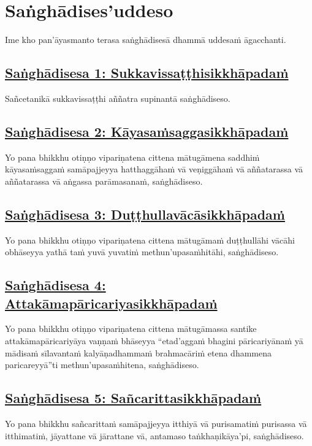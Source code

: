 \setsecheadstyle{\sectionFmt}
\section{Saṅghādises'uddeso}
\label{sd}

\begin{intro}
  Ime kho pan'āyasmanto terasa saṅghādisesā dhammā uddesaṁ āgacchanti.
\end{intro}

\subsection*{\hyperref[comm1]{Saṅghādisesa 1: Sukkavissaṭṭhisikkhāpadaṁ}}
\label{sd1}
Sañcetanikā sukkavissaṭṭhi aññatra supinantā saṅghādiseso.

\subsection*{\hyperref[comm2]{Saṅghādisesa 2: Kāyasaṁsaggasikkhāpadaṁ}}
\label{sd2}
Yo pana bhikkhu otiṇṇo vipariṇatena cittena mātugāmena saddhiṁ kāyasaṁsaggaṁ samāpajjeyya hatthaggāhaṁ vā veṇiggāhaṁ vā aññatarassa vā aññatarassa vā aṅgassa parāmasanaṁ, saṅghādiseso.

\subsection*{\hyperref[comm3]{Saṅghādisesa 3: Duṭṭhullavācāsikkhāpadaṁ}}
\label{sd3}
Yo pana bhikkhu otiṇṇo vipariṇatena cittena mātugāmaṁ duṭṭhullāhi vācāhi obhāseyya yathā taṁ yuvā yuvatiṁ methun'upasaṁhitāhi, saṅghādiseso.

\subsection*{\hyperref[comm4]{Saṅghādisesa 4: Attakāmapāricariyasikkhāpadaṁ}}
\label{sd4}
Yo pana bhikkhu otiṇṇo vipariṇatena cittena mātugāmassa santike attakāmapāricariyāya vaṇṇaṁ bhāseyya “etad'aggaṁ bhagini pāricariyānaṁ yā mādisaṁ sīlavantaṁ kalyāṇadhammaṁ brahmacāriṁ etena dhammena paricareyyā”ti methun'upasaṁhitena, saṅghādiseso.

\subsection*{\hyperref[comm5]{Saṅghādisesa 5: Sañcarittasikkhāpadaṁ}}
\label{sd5}
Yo pana bhikkhu sañcarittaṁ samāpajjeyya itthiyā vā purisamatiṁ purisassa vā itthimatiṁ, jāyattane vā jārattane vā, antamaso taṅkhaṇikāya'pi, saṅghādiseso.

